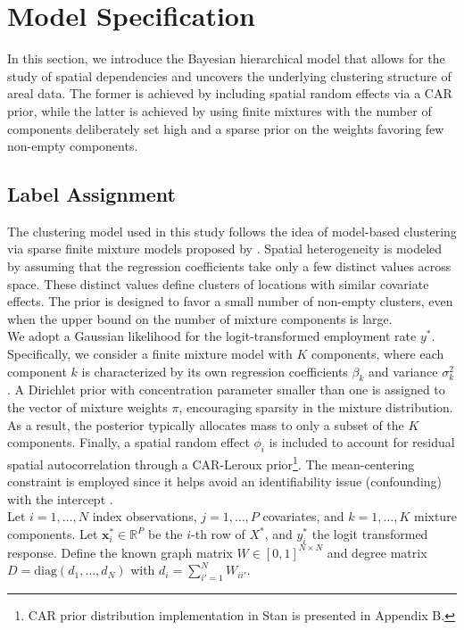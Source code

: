 \section{Model Specification}
\label{sec:models}
In this section, we introduce the Bayesian hierarchical model that allows for the study of spatial dependencies and uncovers the underlying clustering structure of areal data. The former is achieved by including spatial random effects via a CAR prior, while the latter is achieved by using finite mixtures with the number of components deliberately set high and a sparse prior on the weights favoring few non-empty components.

\subsection{Label Assignment}
\label{subsec:Label-Assignment}

The clustering model used in this study follows the idea of model-based clustering via sparse finite mixture models proposed by \cite{Malsiner-Walli2014}. Spatial heterogeneity is modeled by assuming that the regression coefficients take only a few distinct values across space. These distinct values define clusters of locations with similar covariate effects. The prior is designed to favor a small number of non-empty clusters, even when the upper bound on the number of mixture components is large.\\

We adopt a Gaussian likelihood for the logit-transformed employment rate $y^*$. Specifically, we consider a finite mixture model with $K$ components, where each component $k$ is characterized by its own regression coefficients $\beta_k$ and variance $\sigma_k^2$. A Dirichlet prior with concentration parameter smaller than one is assigned to the vector of mixture weights $\pi$, encouraging sparsity in the mixture distribution. As a result, the posterior typically allocates mass to only a subset of the $K$ components. Finally, a spatial random effect $\phi_i$ is included to account for residual spatial autocorrelation through a CAR-Leroux prior\footnote{CAR prior distribution implementation in Stan is presented in Appendix B.}. The mean-centering constraint is employed since it helps avoid an identifiability issue (confounding) with the intercept \citep{duncan2024developing}.\\

Let $i=1,\dots,N$ index observations, $j=1,\dots,P$ covariates, and $k=1,\dots,K$ mixture components. Let $\mathbf{x}_i^\ast \in \mathbb{R}^P$ be the $i$-th row of $X^\ast$, and $y_i^\ast$ the logit transformed response. Define the known graph matrix $W\in[0,1]^{N\times N}$ and degree matrix $D=\mathrm{diag}(d_1,\dots,d_N)$ with $d_i=\sum_{i'=1}^N W_{ii'}$.

